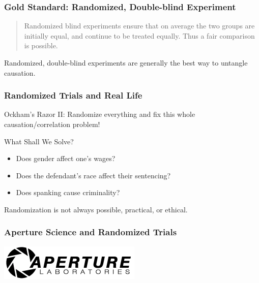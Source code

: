 \documentclass{beamer}
\begin{document}
\begin{frame}
\frametitle{Gold Standard: Randomized, Double-blind Experiment}
	\begin{quote}
		Randomized blind experiments ensure that on average the two groups are initially equal, and continue to be treated equally. Thus a fair comparison is possible.
	\end{quote}
	
	\vspace{2em}
	\begin{alertblock}{Randomized, double-blind experiments are generally the best way to untangle causation.}
	\end{alertblock}
\end{frame}

\begin{frame}
\frametitle{Randomized Trials and Real Life}
	\alert{Ockham's Razor II:} Randomize everything and fix this whole causation/correlation problem!
	\begin{block}{What Shall We Solve?}
		\begin{itemize}[<+->]
			\item Does gender affect one's wages?
			\item Does the defendant's race affect their sentencing?
			\item Does spanking cause criminality?
		\end{itemize}
	\end{block}
\end{frame}

\begin{frame}
	\Huge{Randomization is not always possible, practical, or ethical.}
\end{frame}

\begin{frame}
	\frametitle{Aperture Science and Randomized Trials}
	\begin{center}
		\includegraphics[scale=1]{./images/aperture.png}
	\end{center}
	\href{run:./sound/Cave_Johnson_mandatory_testing.wav}{}
	\href{run:./sound/Cave_Johnson_control1.wav}{}
	\href{run:./sound/Cave_Johnson_control2.wav}{}
\end{frame}
\end{document}
